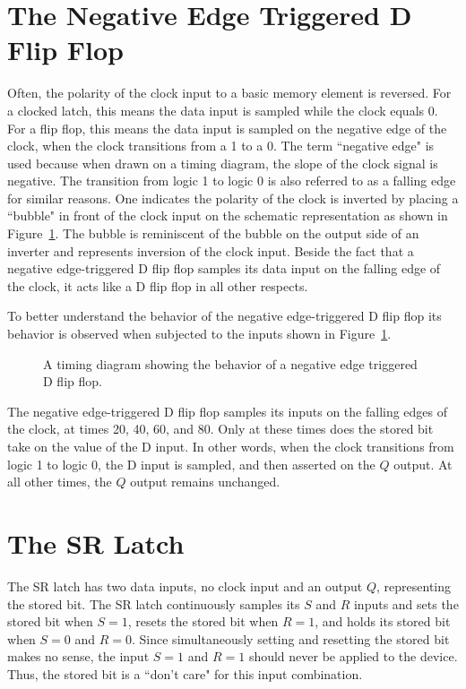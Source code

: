 \section{The Negative Edge Triggered D Flip Flop}
Often, the polarity of the clock input to a
basic memory element is reversed.  For a clocked latch, this
means the data input is sampled while the clock equals 0.
For a flip flop, this means the data input is sampled on
the negative edge of the clock, when the clock transitions
from a 1 to a 0. The term ``negative edge" is used because when
drawn on a timing diagram, the slope of the clock signal is
negative.  The transition from logic 1 to logic 0 is also referred
to as a falling edge for similar reasons.
One indicates the polarity
of the clock is inverted by placing a ``bubble" in front of
the clock input on the schematic representation as shown
in Figure~\ref{fig:sequentialCirDFF}.  The bubble is reminiscent
of the bubble on the output side of an inverter and
represents inversion of the clock input. Beside the fact
that a negative edge-triggered D flip flop samples its
data input on the falling edge of the clock, it acts like
a D flip flop in all other respects.

To better understand the behavior of the negative edge-triggered
D flip flop its behavior is observed when subjected to the inputs
shown in Figure~\ref{fig:sequentialCirDFF}.

\begin{figure}[ht]
\caption{A timing diagram showing the behavior of a
negative edge triggered D flip flop.}
\label{fig:sequentialCirDFF}
\end{figure}

The negative edge-triggered D flip flop samples its inputs on the
falling edges of the clock, at times 20, 40, 60, and 80.  Only
at these times does the stored bit take on the value of the
D input.  In other words, when the clock transitions from logic 1 to
logic 0, the D input is sampled, and then asserted on the $Q$ output.
At all other times, the $Q$ output remains unchanged.

\section{The SR Latch}
The SR latch has two data inputs, no clock input and an output $Q$,
representing the stored bit. The SR latch continuously samples
its $S$ and $R$ inputs and sets the stored bit when $S=1$, resets the
stored bit when $R=1$, and holds its stored bit when $S=0$ and $R=0$.
Since simultaneously setting and resetting the
stored bit makes no sense, the input $S=1$ and $R=1$ should never be applied to
the device.  Thus, the stored bit is a ``don't care" for this input
combination.

